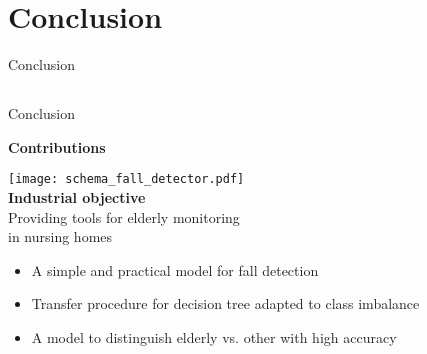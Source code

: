 \section{Conclusion}



\begingroup
{}  %
\begin{frame}[noframenumbering]{}
    \centering
    \vspace{3cm}
    \Huge
    \textcolor{myblue}{Conclusion}
\end{frame}
\endgroup

\subsection{}

\begin{frame}{Conclusion}

\centering
\centering
\textbf{Contributions}

    
\centering
\begin{minipage}[t]{0.47\linewidth}
    \vspace{0pt}
    \texttt{[image: schema\_fall\_detector.pdf]}\\
        \centering\textbf{Industrial objective}\\
        \smallskip
        {\textcolor{myblue}{Providing tools for elderly monitoring\\ in nursing homes}}
        \medskip
\end{minipage}\hfill
\begin{minipage}[t]{0.47\linewidth}
\begin{itemize}
    \item A simple and practical model for fall detection
    \item Transfer procedure for decision tree adapted to class imbalance
    \item A model to distinguish elderly vs. other with high accuracy
\end{itemize}
\end{minipage}


\end{frame}
